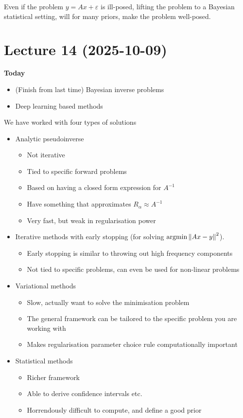 \documentclass[12pt]{article}
\begin{document}
Even if the problem $y= Ax+\varepsilon$ is ill-posed, lifting the problem to a Bayesian statistical setting, will for many priors, make the problem well-posed.

\newpage

\section{Lecture 14 (2025-10-09)}
\textbf{Today}
\begin{itemize}
    \item (Finish from last time) Bayesian inverse problems
    \item Deep learning based methods
\end{itemize}

We have worked with four types of solutions
\begin{itemize}
    \item Analytic pseudoinverse
    \begin{itemize}
        \item Not iterative
        \item Tied to specific forward problems
        \item Based on having a closed form expression for $A^{-1}$
        \item Have something that approximates $R_\alpha \approx A^{-1}$
        \item Very fast, but weak in regularisation power 
    \end{itemize}
    \item Iterative methods with early stopping (for solving $\operatorname{argmin} \left\lVert Ax-y\right\rVert^2$).
    \begin{itemize}
        \item Early stopping is similar to throwing out high frequency components
        \item Not tied to specific problems, can even be used for non-linear problems
    \end{itemize}
    \item Variational methods
    \begin{itemize}
        \item Slow, actually want to solve the minimisation problem
        \item The general framework can be tailored to the specific problem you are working with
        \item Makes regularisation parameter choice rule computationally important
    \end{itemize}
    \item Statistical methods
    \begin{itemize}
        \item Richer framework
        \item Able to derive confidence intervals etc.
        \item Horrendously difficult to compute, and define a good prior
    \end{itemize}
\end{itemize}
\end{document}

